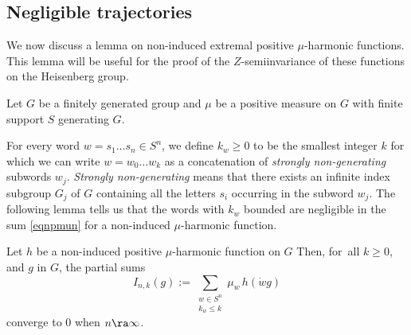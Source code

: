 \subsection{Negligible trajectories}
\label{secnegtra}
\bq
We now discuss a lemma on non-induced extre\-mal positive $\mu$-harmonic functions.
This lemma will be useful for the proof of the $Z$\nobreakdash-semiinvariance
of these functions on the Heisenberg group.
\eq

Let $G$ be a finitely generated group
and $\mu$ be a positive measure on $G$ with finite support $S$
generating $G$.

For every word $w=s_1\ldots s_n\in S^n$, we define
$k_w\geq 0 $ to be the smallest integer $k$ for which we can
write $w=w_0\ldots w_k$ as a concatenation of \emph{strongly non-generating} subwords $w_j$.
\emph{Strongly non-generating} means that
there exists an infinite index subgroup $G_j$ of $G$
containing all the letters $s_i$ occurring
in the subword $w_j$.
The following lemma tells us that the words with $k_w$ bounded
are negligible
in the sum \eqref{eqnpmun} for a non-induced $\mu$-harmonic function.

\begin{Lem}
\label{lemnegtra}
Let $h$ be a non-induced positive $\mu$-harmonic function on $G$
Then, for~all $k\geq 0$, and $g$ in $G$, the partial sums
\begin{equation}
\label{eqnlimsumhgg}
I_{n,k}(g):=\sum_{\substack{w\in S^n\\ k_w\leq k}} \mu_w\, h(\dot{w}g)
\end{equation}
converge to $0$ when $n\ra\infty$.
\end{Lem}

